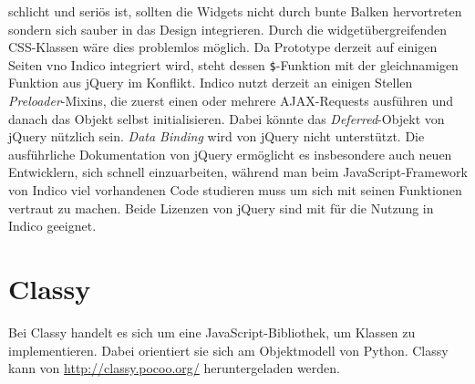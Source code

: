schlicht und seriös ist, sollten die Widgets nicht durch bunte Balken hervortreten sondern sich
sauber in das Design integrieren. Durch die widgetübergreifenden CSS-Klassen wäre dies problemlos
möglich. Da Prototype derzeit auf einigen Seiten vno Indico integriert wird, steht dessen
\lstinline{$}-Funktion mit der gleichnamigen Funktion aus jQuery im Konflikt. Indico nutzt derzeit
an einigen Stellen \emph{Preloader}-Mixins, die zuerst einen oder mehrere AJAX-Requests ausführen
und danach das Objekt selbst initialisieren. Dabei könnte das \emph{Deferred}-Objekt von jQuery
nützlich sein. \emph{Data Binding} wird von jQuery nicht unterstützt. Die ausführliche Dokumentation
von jQuery ermöglicht es insbesondere auch neuen Entwicklern, sich schnell einzuarbeiten, während
man beim JavaScript-Framework von Indico viel vorhandenen Code studieren muss um sich mit seinen
Funktionen vertraut zu machen. Beide Lizenzen von jQuery sind mit für die Nutzung in Indico
geeignet.






\section{Classy}
Bei Classy handelt es sich um eine JavaScript-Bibliothek, um Klassen zu implementieren. Dabei
orientiert sie sich am Objektmodell von Python. Classy kann von
\href{http://classy.pocoo.org/}{http://classy.pocoo.org/} heruntergeladen werden.

